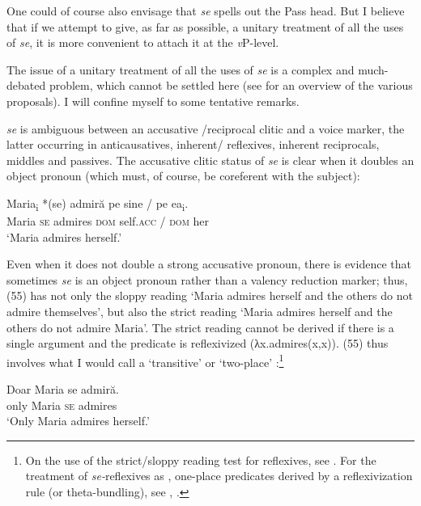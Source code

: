 \documentclass[output=paper]{langsci/langscibook}
\begin{document}
One could of course also envisage that \textit{se} spells out the Pass head. But I believe that if we attempt to give, as far as possible, a unitary treatment of all the uses of \textit{se}, it is more convenient to  attach it at the \textit{v}P-level.

The issue of a unitary treatment of all the uses of \textit{se} is a complex and much-debated problem, which cannot be settled here (see \citealt{Dobrovie-Sorin2017} for an overview of the various proposals). I will confine myself to some tentative remarks.

 \textit{se} is ambiguous between an accusative \slash reciprocal clitic and a voice marker, the latter occurring in anticausatives, inherent\slash {} reflexives, inherent reciprocals, middles and passives. The accusative clitic status of \textit{se} is clear when it doubles an object pronoun (which must, of course, be coreferent with the subject):

\ea%
    \label{ex:giurgea:54}
    \gll Maria\textsubscript{i} *(se) admiră  pe    sine        / pe    ea\textsubscript{i}.\\
         Maria     \textsc{se} admires \textsc{dom} self.\textsc{acc} /  \textsc{dom} her\\
    \glt ‘Maria admires herself.’
    \z

Even when it does not double a strong accusative pronoun, there is evidence that sometimes  \textit{se} is an object pronoun rather than a valency reduction marker; thus, (55) has not only the sloppy reading ‘Maria admires herself and the others do not admire themselves’, but also the strict reading ‘Maria admires herself and the others do not admire Maria’. The strict reading cannot be derived if there is a single argument and the predicate is reflexivized (λx.admires(x,x)). (55) thus involves what I would call a ‘transitive' or ‘two-place' :\footnote{On the use of the strict\slash sloppy reading test for reflexives, see \citet{Sells1987,Labelle2008}. For the treatment of \textit{se-}reflexives as , one-place predicates derived by a reflexivization rule (or theta-bundling), see \citet{Reinhart1996}, \citet{Labelle2008}.}   

\ea%
    \label{ex:giurgea:55}
    \gll Doar  Maria se admiră.       \\
         only   Maria \textsc{se} admires          \\
    \glt ‘Only Maria admires herself.’
    \z
\end{document}
